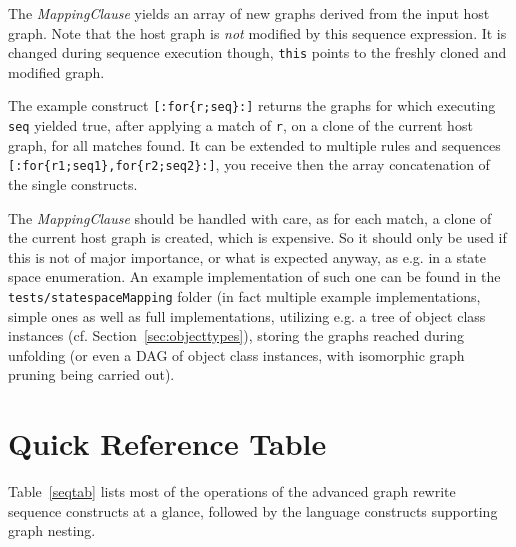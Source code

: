 The \emph{MappingClause} yields an array of new graphs derived from the input host graph.
Note that the host graph is \emph{not} modified by this sequence expression.
It is changed during sequence execution though, \texttt{this} points to the freshly cloned and modified graph.

The example construct \verb#[:for{r;seq}:]# returns the graphs for which executing \texttt{seq} yielded true, after applying a match of \texttt{r}, on a clone of the current host graph, for all matches found.
It can be extended to multiple rules and sequences \verb#[:for{r1;seq1},for{r2;seq2}:]#, you receive then the array concatenation of the single constructs.

The \emph{MappingClause} should be handled with care, as for each match, a clone of the current host graph is created, which is expensive.
So it should only be used if this is not of major importance, or what is expected anyway, as e.g. in a state space enumeration.
An example implementation of such one can be found in the \texttt{tests/statespaceMapping} folder
(in fact multiple example implementations, simple ones as well as full implementations, utilizing e.g. a tree of object class instances (cf. Section~\ref{sec:objecttypes}), storing the graphs reached during unfolding (or even a DAG of object class instances, with isomorphic graph pruning being carried out).


\section{Quick Reference Table}

Table~\ref{seqtab} lists most of the operations of the advanced graph rewrite sequence constructs at a glance, followed by the language constructs supporting graph nesting.

